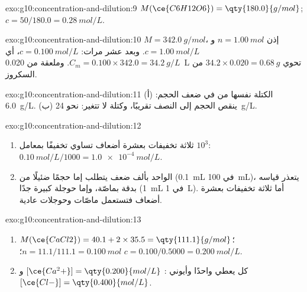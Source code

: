 \begin{solution}{exo:g10:concentration-and-dilution:9}
$M(\ce{C6H12O6}) = \qty{180.0}{g/mol}$; $c = 50 / 180.0 =
\qty{0.28}{mol/L}$.
\end{solution}

\begin{solution}{exo:g10:concentration-and-dilution:10}
$M = \qty{342.0}{g/mol}$، إذن $n = \qty{1.00}{mol}$ و$c =
\qty{1.00}{mol/L}$. وبعد  عشر مرات: $c = \qty{0.100}{mol/L}$، أي
$C_m = 0.100 \times 342.0 = \qty{34.2}{g/L}$. وملعقة من
\qty{0.020}{L} تحوي $34.2 \times 0.020 = \qty{0.68}{g}$ من السكروز.
\end{solution}

\begin{solution}{exo:g10:concentration-and-dilution:11}
(أ) الكتلة نفسها من  في ضعف الحجم: \qty{6.0}{g/L}.
(ب) ينقص الحجم إلى النصف تقريبًا، وكتلة  لا تتغير: نحو
\qty{24}{g/L}.
\end{solution}

\begin{solution}{exo:g10:concentration-and-dilution:12}
\begin{enumerate}
  \item ثلاثة تخفيفات بعشرة أضعاف تساوي تخفيفًا بمعامل $10^3$:
        $\qty{0.10}{mol/L} / 1000 = \qty{1.0e-4}{mol/L}$.
  \item {} الواحد بألف ضعف يتطلب إما حجمًا ضئيلًا من 
        (\qty{0.1}{mL} في \qty{100}{mL})، يتعذر قياسه بدقة بماصّة، وإما
        حوجلة كبيرة جدًا (\qty{1}{mL} في \qty{1}{L}). أما ثلاثة تخفيفات
        بعشرة أضعاف فتستعمل ماصّات وحوجلات
        عادية.
\end{enumerate}
\end{solution}

\begin{solution}{exo:g10:concentration-and-dilution:13}
\begin{enumerate}
  \item $M(\ce{CaCl2}) = 40.1 + 2 \times 35.5 = \qty{111.1}{g/mol}$؛
        $n = 11.1 / 111.1 = \qty{0.100}{mol}$؛ $c = 0.100 / 0.5000 =
        \qty{0.200}{mol/L}$.
  \item كل  يعطي   واحدًا وأيوني :
        $[\ce{Ca^2+}] = \qty{0.200}{mol/L}$ و$[\ce{Cl-}] =
        \qty{0.400}{mol/L}$.
\end{enumerate}
\end{solution}

